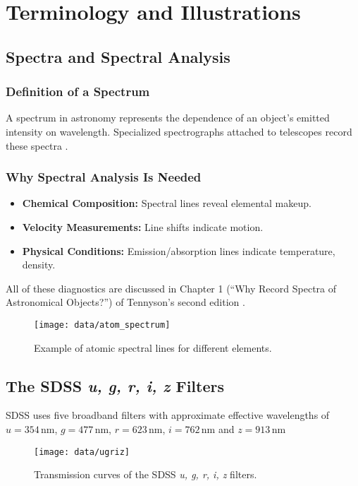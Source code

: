 \documentclass[english,bachelor,oneside]{ctufit-thesis}
\begin{document}
\section{Terminology and Illustrations}

\subsection{Spectra and Spectral Analysis}

\subsubsection{Definition of a Spectrum}
A spectrum in astronomy represents the dependence of an object's emitted intensity on wavelength. Specialized spectrographs attached to telescopes record these spectra \cite{tennyson2019astronomical}.

\subsubsection{Why Spectral Analysis Is Needed}
\begin{itemize}
    \item \textbf{Chemical Composition:} Spectral lines reveal elemental makeup.
    \item \textbf{Velocity Measurements:} Line shifts indicate motion.
    \item \textbf{Physical Conditions:} Emission/absorption lines indicate temperature, density.
\end{itemize}
All of these diagnostics are discussed in Chapter 1 (“Why Record Spectra of Astronomical Objects?”) of Tennyson’s second edition \cite[p.~1–6]{tennyson2019astronomical}.

\begin{figure}[h]
    \centering
    \texttt{[image: data/atom\_spectrum]}
    \caption{Example of atomic spectral lines for different elements.\cite{Spectros98:online}}
    \label{fig:atom_spectrum}
\end{figure}

\subsection{The SDSS \textit{u, g, r, i, z} Filters}
SDSS uses five broadband filters with approximate effective wavelengths of
$u = 354\,$nm, $g = 477\,$nm, $r = 623\,$nm, $i = 762\,$nm and $z = 913\,$nm 
\cite{fukugita1996sloan}
\begin{figure}[h]
    \centering
    \texttt{[image: data/ugriz]}
    \caption{Transmission curves of the SDSS \textit{u, g, r, i, z} filters.}
    \label{fig:ugriz}
\end{figure}
\end{document}
